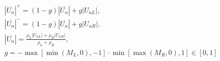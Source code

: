 \documentclass[10pt]{article}
\begin{document}
\begin{align*}& | \overline{ U_{n}} |^{+}
=
\left( 1 - g \right) | \overline{ U_{n}} | + g | U_{nL} |, \\
& | \overline{ U_{n}} |^{-}
=
\left( 1 - g \right) | \overline{ U_{n}} | + g | U_{nR} |, \\
&
| \overline{ U_{n} } | 
=
\frac{\rho_{L} | U_{nL}| + \rho_{R} | U_{nR}| }{\rho_{L} + \rho_{R} }, \\
& g
=
- \max \left[ \min \left( M_{L}, 0 \right), -1 \right] \cdot \min \left[ \max \left( M_{R}, 0\right), 1 \right] \in \left[ 0,1\right]\end{align*}
\end{document}
